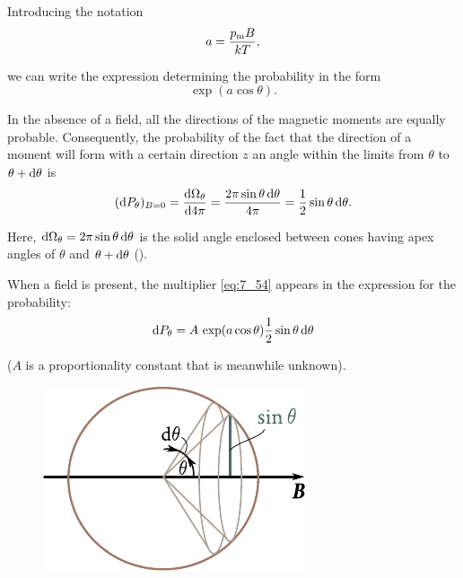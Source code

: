 \noindent
Introducing the notation
\begin{equation}\label{eq:7_53}
    a = \frac{p_{\text{m}} B}{kT},
\end{equation}

\noindent
we can write the expression determining the probability in the form
\begin{equation}\label{eq:7_54}
    \exp(a\cos\theta).
\end{equation}

In the absence of a field, all the directions of the magnetic moments are equally probable.
Consequently, the probability of the fact that the direction of a moment will form with a certain direction $z$ an angle within the limits from $\theta$ to $\theta + \mathrm{d}\theta$ is
\begin{equation}\label{eq:7_55}
    (\mathrm{d} P_{\theta})_{B=0} = \dfrac{\mathrm{d}\Omega_{\theta}}{\mathrm{d}4\pi} = \frac{2\pi\sin\theta\, \mathrm{d}\theta}{4\pi} = \frac{1}{2}\sin\theta\, \mathrm{d}\theta.
\end{equation}

\noindent
Here, $\mathrm{d}\Omega_{\theta}=2\pi\sin\theta\, \mathrm{d}\theta$ is the solid angle enclosed between cones having apex angles of $\theta$ and $\theta+\mathrm{d}\theta$ ().

When a field is present, the multiplier \eqref{eq:7_54} appears in the expression for the
probability:
\begin{equation}\label{eq:7_56}
    \mathrm{d} P_{\theta} = A\, \exp(a\cos\theta) \frac{1}{2}\sin\theta\, \mathrm{d}\theta
\end{equation}

\noindent
($A$ is a proportionality constant that is meanwhile unknown).

\begin{figure}[t]
	\begin{center}
		\includegraphics[scale=1]{figures/ch_07/fig_7_16.pdf}
		\caption[]{}
		\label{fig:7_16}
	\end{center}
	\vspace{-0.8cm}
\end{figure}

